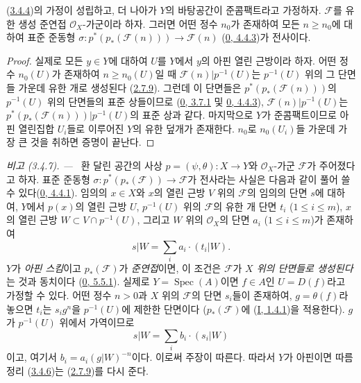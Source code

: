 \begin{corollary}[3.4.6]
\label{II.3.4.6-ko}
(\hyperref[II.3.4.4-ko]{3.4.4})의 가정이 성립하고, 더 나아가 $Y$의
바탕공간이 준콤팩트라고 가정하자. $\mathcal{F}$를 유한 생성 준연접
$\mathcal{O}_X$-가군이라 하자. 그러면 어떤 정수 $n_0$가 존재하여 모든
$n\geq n_0$에 대하여 표준 준동형
$\sigma:p^*(p_*(\mathcal{F}(n)))\to\mathcal{F}(n)$
(\hyperref[0.4.4.3-ko]{0, 4.4.3})가 전사이다.
\end{corollary}

\begin{proof}
실제로 모든 $y\in Y$에 대하여 $U$를 $Y$에서 $y$의 아핀 열린 근방이라
하자. 어떤 정수 $n_0(U)$가 존재하여 $n\geq n_0(U)$일 때
$\mathcal{F}(n)|p^{-1}(U)$는 $p^{-1}(U)$ 위의 그 단면들 가운데 유한 개로
생성된다 (\hyperref[II.2.7.9-ko]{2.7.9}). 그런데 이 단면들은
$p^*(p_*(\mathcal{F}(n)))$의 $p^{-1}(U)$ 위의 단면들의 표준 상들이므로
(\hyperref[0.3.7.1-ko]{0, 3.7.1} 및
\hyperref[0.4.4.3-ko]{0, 4.4.3}),
$\mathcal{F}(n)|p^{-1}(U)$는
$p^*(p_*(\mathcal{F}(n)))|p^{-1}(U)$의 표준 상과 같다. 마지막으로 $Y$가
준콤팩트이므로 아핀 열린집합 $U_i$들로 이루어진 $Y$의 유한 덮개가
존재한다. $n_0$로 $n_0(U_i)$들 가운데 가장 큰 것을 취하면 증명이
끝난다.
\end{proof}

\par\medskip\noindent\textit{비고 (3.4.7). ---\ }
\label{II.3.4.7-ko}
환 달린 공간의 사상 $p=(\psi,\theta):X\to Y$와
$\mathcal{O}_X$-가군 $\mathcal{F}$가 주어졌다고 하자. 표준 준동형
$\sigma:p^*(p_*(\mathcal{F}))\to\mathcal{F}$가 전사라는 사실은 다음과
같이 풀어 쓸 수 있다(\hyperref[0.4.4.1-ko]{0, 4.4.1}). 임의의 $x\in X$와
$x$의 열린 근방 $V$ 위의 $\mathcal{F}$의 임의의 단면 $s$에 대하여,
$Y$에서 $p(x)$의 열린 근방 $U$, $p^{-1}(U)$ 위의 $\mathcal{F}$의 유한 개
단면 $t_i$ ($1\leq i\leq m$), $x$의 열린 근방
$W\subset V\cap p^{-1}(U)$, 그리고 $W$ 위의 $\mathcal{O}_X$의 단면 $a_i$
($1\leq i\leq m$)가 존재하여
\[
  s|W=\sum_i a_i\cdot(t_i|W).
\]
$Y$가 \emph{아핀 스킴}이고 $p_*(\mathcal{F})$가 \emph{준연접}이면, 이 조건은
$\mathcal{F}$가 \emph{$X$ 위의 단면들로 생성된다}는 것과 동치이다
(\hyperref[0.5.5.1-ko]{0, 5.5.1}). 실제로
$Y=\operatorname{Spec}(A)$이면 $f\in A$인 $U=D(f)$라고 가정할 수 있다.
어떤 정수 $n>0$과 $X$ 위의 $\mathcal{F}$의 단면 $s_i$들이 존재하여,
$g=\theta(f)$라 놓으면 $t_i$는 $s_ig^n$을 $p^{-1}(U)$에 제한한 단면이다
($p_*(\mathcal{F})$에 (\hyperref[I.1.4.1-ko]{I, 1.4.1})을 적용한다).
$g$가 $p^{-1}(U)$ 위에서 가역이므로
\[
  s|W=\sum_i b_i\cdot(s_i|W)
\]
이고, 여기서 $b_i=a_i(g|W)^{-n}$이다. 이로써 주장이 따른다. 따라서
$Y$가 아핀이면 따름정리 (\hyperref[II.3.4.6-ko]{3.4.6})는
(\hyperref[II.2.7.9-ko]{2.7.9})를 다시 준다.

